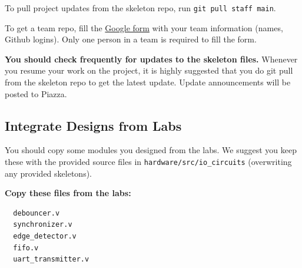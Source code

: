 \documentclass[11pt]{article}
\begin{document}
To pull project updates from the skeleton repo, run \verb|git pull staff main|.

To get a team repo, fill the \href{https://docs.google.com/forms/d/1hOJek4q_Z6SokflpH17gOESGGCXmY1VfdJ5VLMNku1U}{Google form} with your team information (names, Github logins). Only one person in a team is required to fill the form.

\textbf{You should check frequently for updates to the skeleton files.} Whenever you resume your work on the project,
it is highly suggested that you do git pull from the skeleton repo to get the latest update.
Update announcements will be posted to Piazza.

\subsection{Integrate Designs from Labs} \label{past_designs}
You should copy some modules you designed from the labs.
We suggest you keep these with the provided source files in \verb|hardware/src/io_circuits| (overwriting any provided skeletons).

\textbf{Copy these files from the labs:}
\begin{verbatim}
  debouncer.v
  synchronizer.v
  edge_detector.v
  fifo.v
  uart_transmitter.v
\end{verbatim}
\end{document}
